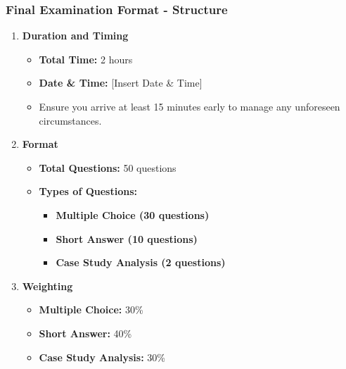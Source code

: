 \documentclass[aspectratio=169]{beamer}
\begin{document}
\begin{frame}[fragile]
    \frametitle{Final Examination Format - Structure}
    \begin{enumerate}
        \item \textbf{Duration and Timing}
            \begin{itemize}
                \item \textbf{Total Time:} 2 hours
                \item \textbf{Date \& Time:} [Insert Date \& Time]
                \item Ensure you arrive at least 15 minutes early to manage any unforeseen circumstances.
            \end{itemize}
        \item \textbf{Format}
            \begin{itemize}
                \item \textbf{Total Questions:} 50 questions
                \item \textbf{Types of Questions:}
                \begin{itemize}
                    \item \textbf{Multiple Choice (30 questions)}
                    \item \textbf{Short Answer (10 questions)}
                    \item \textbf{Case Study Analysis (2 questions)}
                \end{itemize}
            \end{itemize}
        \item \textbf{Weighting}
            \begin{itemize}
                \item \textbf{Multiple Choice:} 30\%
                \item \textbf{Short Answer:} 40\%
                \item \textbf{Case Study Analysis:} 30\%
            \end{itemize}
    \end{enumerate}
\end{frame}
\end{document}
